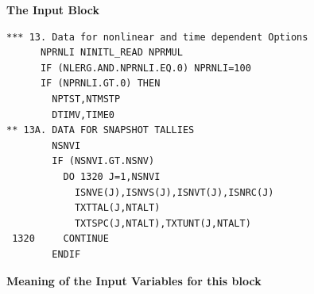 \medskip

\textbf{The Input Block} 

\begin{lstlisting}
*** 13. Data for nonlinear and time dependent Options
      NPRNLI NINITL_READ NPRMUL
      IF (NLERG.AND.NPRNLI.EQ.0) NPRNLI=100
      IF (NPRNLI.GT.0) THEN
        NPTST,NTMSTP
        DTIMV,TIME0
** 13A. DATA FOR SNAPSHOT TALLIES
        NSNVI
        IF (NSNVI.GT.NSNV)
          DO 1320 J=1,NSNVI
            ISNVE(J),ISNVS(J),ISNVT(J),ISNRC(J)
            TXTTAL(J,NTALT)
            TXTSPC(J,NTALT),TXTUNT(J,NTALT)
 1320     CONTINUE
        ENDIF
\end{lstlisting} 

\medskip 

\textbf{Meaning of the Input Variables for this block} 

\medskip 

